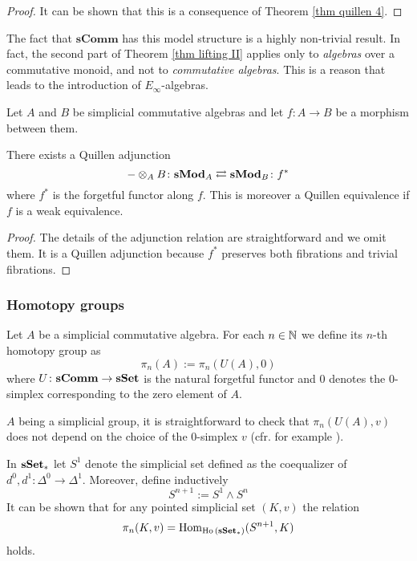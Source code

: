 \begin{refsection}
\begin{proof}
It can be shown that this is a consequence of Theorem \ref{thm quillen 4}.
\end{proof}

\begin{rmk}
The fact that $\mathbf{sComm}$ has this model structure is a highly non-trivial result. In fact, the second part of Theorem \ref{thm lifting II} applies only to \emph{algebras} over a commutative monoid, and not to \emph{commutative algebras}. This is a reason that leads to the introduction of $E_\infty$-algebras.
\end{rmk}

Let $A$ and $B$ be simplicial commutative algebras and let $f \colon A \to B$ be a morphism between them.

\begin{lemma}
  \label{lemma:quillen-adjunction-equivalence-simplicial-tensor-product}
There exists a Quillen adjunction
\[
- \otimes_A B \colon \mathbf s \mathbf{Mod}_A \rightleftarrows \mathbf s \mathbf{Mod}_B \colon f^*
\]
where $f^*$ is the forgetful functor along $f$. This is moreover a Quillen equivalence if $f$ is a weak equivalence.
\end{lemma}

\begin{proof}
The details of the adjunction relation are straightforward and we omit them. It is a Quillen adjunction because $f^*$ preserves both fibrations and trivial fibrations.
\end{proof}

\subsubsection{Homotopy groups}

Let $A$ be a simplicial commutative algebra. For each $n \in \mathbb{N}$ we define its $n$-th homotopy group as
\[
\pi_n(A) := \pi_n(U(A),0)
\]
where $U \colon \mathbf{sComm} \to \mathbf{sSet}$ is the natural forgetful functor and $0$ denotes the $0$-simplex corresponding to the zero element of $A$.

\begin{rmk}
$A$ being a simplicial group, it is straightforward to check that $\pi_n(U(A),v)$ does not depend on the choice of the $0$-simplex $v$ (cfr. for example \cite[Ex. 8.3.1]{weibel}).
\end{rmk}

\begin{rmk}
In $\mathbf{sSet}_*$ let $S^1$ denote the simplicial set defined as the coequalizer of $d^0,d^1 \colon \Delta^0 \to \Delta^1$. Moreover, define inductively
\[
S^{n+1} := S^1 \wedge S^n
\]
It can be shown that for any pointed simplicial set $(K,v)$ the relation
\[
\pi_n(K,v) = \mathrm{Hom}_{\operatorname{\mathrm{Ho} \,}(\mathbf{sSet}_*)}(S^{n+1},K)
\]
holds.
\end{rmk}


\end{refsection}
